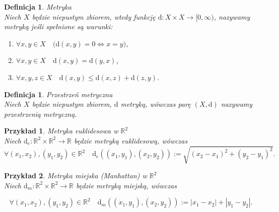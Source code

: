 \documentclass[12pt,a4paper]{report}
\newtheorem{definition}[theorem]{Definicja}
\newtheorem{example}{Przykład}
\begin{document}
\begin{definition}{Metryka \cite[Rozdzial 9]{kuratowski2004}}\\
Niech $X$ będzie niepustym zbiorem, wtedy funkcję $\mathrm{d}: X \times X \rightarrow [0,\infty)$, nazywamy metryką jeśli spełnione są warunki:
\begin{enumerate}
\item $\forall x, y \in X \quad \big(\mathrm{d}(x,y) = 0  \Longleftrightarrow x=y \big)$,
\item $\forall x, y \in X \quad \mathrm{d}(x,y)=\mathrm{d}(y,x)$,
\item $\forall  x, y, z \in X \quad \mathrm{d}(x,y)\leq \mathrm{d}(x,z)+\mathrm{d}(z,y)$.
\end{enumerate}
\end{definition}


\begin{definition}{Przestrzeń metryczna \cite[Rozdział 9]{kuratowski2004}}\\
Niech $X$ będzie niepustym zbiorem, $\mathrm{d}$ metryką, wówczas parę $(X,\mathrm{d})$ nazywamy przestrzenią metryczną. 
\end{definition}


\begin{example}{Metryka euklidesowa w $\mathbb{R}^2$}\\
Niech $\mathrm{d}_e: \mathbb{R}^2 \times \mathbb{R}^2 \rightarrow \mathbb{R}$ będzie metryką euklidesową, wówczas
$$\forall{(x_{1},x_{2}),(y_{1},y_{2}) \in \mathbb{R}^2} \quad \mathrm{d}_e((x_1,y_1),(x_2,y_2)):= \sqrt{(x_2-x_1)^2+(y_2-y_1)^2}. $$
\end{example}


\begin{example}{Metryka miejska (Manhattan) w $\mathbb{R}^2$}\\
Niech $\mathrm{d}_m: \mathbb{R}^2 \times \mathbb{R}^2 \rightarrow \mathbb{R}$ będzie metryką miejską, wówczas 

$$\forall{(x_{1},x_{2}),(y_{1},y_{2}) \in \mathbb{R}^2} \quad \mathrm{d}_m((x_1,y_1),(x_2,y_2)):=|x_1-x_2|+|y_1-y_2|.$$

\end{example}
\end{document}
